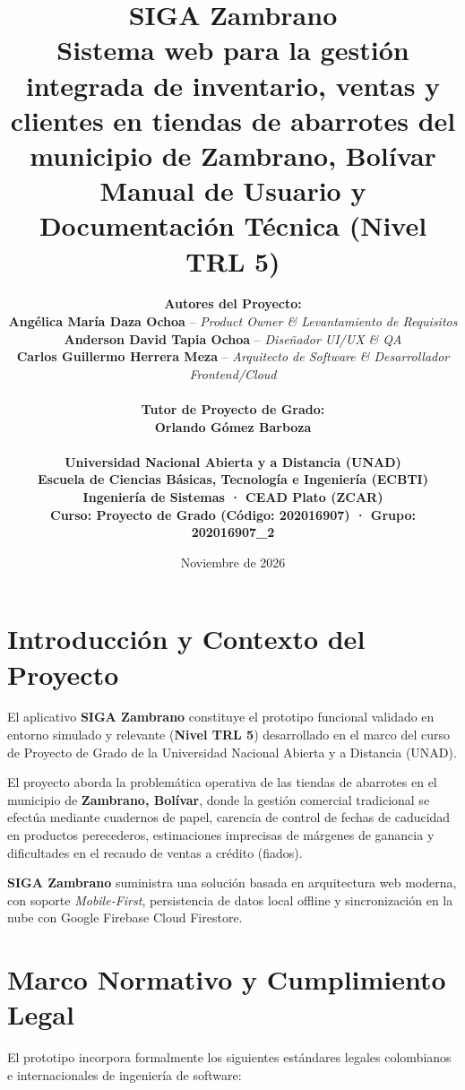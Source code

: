 \documentclass[12pt,a4paper]{article}
\title{
    \vspace{-1.5cm}
    \textbf{\Huge SIGA Zambrano} \\
    \vspace{0.4cm}
    \Large \textbf{Sistema web para la gestión integrada de inventario, ventas y clientes en tiendas de abarrotes del municipio de Zambrano, Bolívar} \\
    \vspace{0.3cm}
    \large Manual de Usuario y Documentación Técnica (Nivel TRL 5)
}
\author{
    \textbf{Autores del Proyecto:} \\
    \textbf{Angélica María Daza Ochoa} -- \textit{Product Owner \& Levantamiento de Requisitos} \\
    \textbf{Anderson David Tapia Ochoa} -- \textit{Diseñador UI/UX \& QA} \\
    \textbf{Carlos Guillermo Herrera Meza} -- \textit{Arquitecto de Software \& Desarrollador Frontend/Cloud} \\
    \vspace{0.4cm} \\
    \textbf{Tutor de Proyecto de Grado:} \\
    \textbf{Orlando Gómez Barboza} \\
    \vspace{0.4cm} \\
    \textbf{Universidad Nacional Abierta y a Distancia (UNAD)} \\
    \textbf{Escuela de Ciencias Básicas, Tecnología e Ingeniería (ECBTI)} \\
    \textbf{Ingeniería de Sistemas · CEAD Plato (ZCAR)} \\
    \textbf{Curso: Proyecto de Grado (Código: 202016907) · Grupo: 202016907\_2}
}
\date{Noviembre de 2026}
\begin{document}
\maketitle

\newpage
\tableofcontents
\newpage

\section{Introducción y Contexto del Proyecto}

El aplicativo \textbf{SIGA Zambrano} constituye el prototipo funcional validado en entorno simulado y relevante (\textbf{Nivel TRL 5}) desarrollado en el marco del curso de Proyecto de Grado de la Universidad Nacional Abierta y a Distancia (UNAD).

El proyecto aborda la problemática operativa de las tiendas de abarrotes en el municipio de \textbf{Zambrano, Bolívar}, donde la gestión comercial tradicional se efectúa mediante cuadernos de papel, carencia de control de fechas de caducidad en productos perecederos, estimaciones imprecisas de márgenes de ganancia y dificultades en el recaudo de ventas a crédito (fiados). 

\textbf{SIGA Zambrano} suministra una solución basada en arquitectura web moderna, con soporte \textit{Mobile-First}, persistencia de datos local offline y sincronización en la nube con Google Firebase Cloud Firestore.

\section{Marco Normativo y Cumplimiento Legal}

El prototipo incorpora formalmente los siguientes estándares legales colombianos e internacionales de ingeniería de software:
\end{document}
